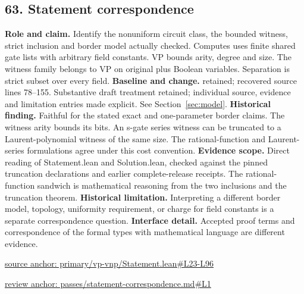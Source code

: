 \documentclass[11pt,letterpaper]{article}
\theoremstyle{definition}\newtheorem{definition}[theorem]{Definition}\newtheorem{example}[theorem]{Example}
\theoremstyle{remark}\newtheorem{remark}[theorem]{Remark}
\begin{document}
\subsection*{63. Statement correspondence}
\textbf{Role and claim.} Identify the nonuniform circuit class, the bounded witness, strict inclusion and border model actually checked. Computes uses finite shared gate lists with arbitrary field constants. VP bounds arity, degree and size. The witness family belongs to VP on original plus Boolean variables. Separation is strict subset over every field.
\textbf{Baseline and change.} retained; recovered source lines 78--155. Substantive draft treatment retained; individual source, evidence and limitation entries made explicit. See Section~\ref{sec:model}.
\textbf{Historical finding.} Faithful for the stated exact and one-parameter border claims. The witness arity bounds its bits. An s-gate series witness can be truncated to a Laurent-polynomial witness of the same size. The rational-function and Laurent-series formulations agree under this cost convention.
\textbf{Evidence scope.} Direct reading of Statement.lean and Solution.lean, checked against the pinned truncation declarations and earlier complete-release receipts. The rational-function sandwich is mathematical reasoning from the two inclusions and the truncation theorem.
\textbf{Historical limitation.} Interpreting a different border model, topology, uniformity requirement, or charge for field constants is a separate correspondence question.
\textbf{Interface detail.} Accepted proof terms and correspondence of the formal types with mathematical language are different evidence.
\par\href{https://github.com/nousentllc/VP-VNP-Review/blob/8a7976933b6b2b4ffda1ad3a0dfb5fc6b6f023e8/primary/vp-vnp/Statement.lean\#L23-L96}{source anchor: primary/vp-vnp/Statement.lean\#L23-L96}
\par\href{https://github.com/nousentllc/VP-VNP-Review/blob/8a7976933b6b2b4ffda1ad3a0dfb5fc6b6f023e8/passes/statement-correspondence.md\#L1}{review anchor: passes/statement-correspondence.md\#L1}
\end{document}
